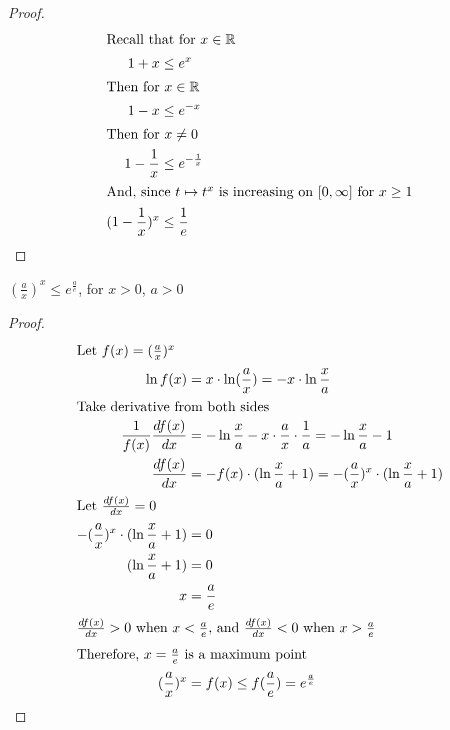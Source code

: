 \begin{proof}

\begin{align}
\shortintertext{Recall that for $x \in \mathbb{R}$}
    1 + x &\le e^x \nonumber \\
\shortintertext{Then for $x \in \mathbb{R}$}
    1 - x &\le e^{-x} \nonumber \\
\shortintertext{Then for $x \neq 0$}
    1 - \frac{1}{x} &\le e^{-\frac{1}{x}} \nonumber \\ 
\shortintertext{And, since $t \mapsto t^x$ is increasing on $[0, \infty]$ for $x \ge 1$}
   (1 - \frac{1}{x})^x &\le \frac{1}{e}
\end{align}

\end{proof}

\begin{lemma}
\label{lemma:(1x)x}

$(\frac{a}{x})^x \le e^\frac{a}{e}$, for $x > 0$, $a > 0$

\end{lemma}

\begin{proof}

\begin{align}
\shortintertext{Let $f(x) = (\frac{a}{x})^x $}
    \ln f(x) &= x \cdot \ln (\frac{a}{x}) \nonumber = - x \cdot \ln \frac{x}{a} \\
\shortintertext{Take derivative from both sides}
    \frac{1}{f(x)} \frac{df(x)}{dx} &= -\ln \frac{x}{a} - x \cdot \frac{a}{x} \cdot \frac{1}{a} = -\ln \frac{x}{a} - 1 \nonumber \\
    \frac{df(x)}{dx} &= - f(x) \cdot (\ln \frac{x}{a} + 1) \nonumber = - (\frac{a}{x})^x \cdot (\ln \frac{x}{a} + 1) \\
\shortintertext{Let $\frac{df(x)}{dx} = 0$}
    - (\frac{a}{x})^x \cdot (\ln \frac{x}{a} + 1) &= 0 \nonumber \\
    (\ln \frac{x}{a} + 1) &= 0 \nonumber \\
    x &= \frac{a}{e} \nonumber \\
\shortintertext{$\frac{df(x)}{dx} > 0$ when $x < \frac{a}{e}$, and $\frac{df(x)}{dx} < 0$ when $x > \frac{a}{e}$}
\shortintertext{Therefore, $x = \frac{a}{e}$ is a maximum point}
    (\frac{a}{x})^x &= f(x) \le f(\frac{a}{e}) = {e}^\frac{a}{e}
\end{align}

\end{proof}

